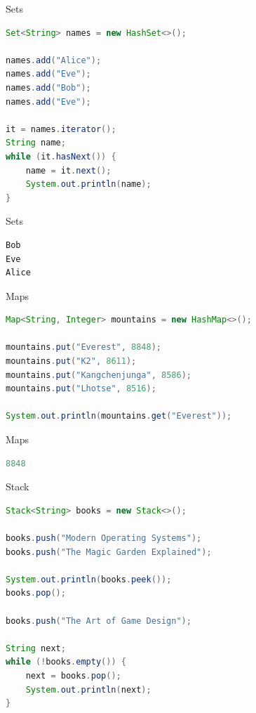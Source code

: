\documentclass[18pt]{beamer}
\begin{document}
\begin{frame}[fragile]{Sets}
    \begin{lstlisting}[language=Java]
Set<String> names = new HashSet<>();

names.add("Alice");
names.add("Eve");
names.add("Bob");
names.add("Eve");

it = names.iterator();
String name;
while (it.hasNext()) {
    name = it.next();
    System.out.println(name);
}
    \end{lstlisting}

\end{frame}

\begin{frame}[fragile]{Sets}
    \begin{exampleblock}{}
        \begin{lstlisting}[language=Java]
Bob
Eve
Alice
        \end{lstlisting}
    \end{exampleblock}

\end{frame}


\begin{frame}[fragile]{Maps}
    \begin{lstlisting}[language=Java]
Map<String, Integer> mountains = new HashMap<>();

mountains.put("Everest", 8848);
mountains.put("K2", 8611);
mountains.put("Kangchenjunga", 8586);
mountains.put("Lhotse", 8516);

System.out.println(mountains.get("Everest"));
    \end{lstlisting}
\end{frame}

\begin{frame}[fragile]{Maps}

    \begin{exampleblock}{}
        \begin{lstlisting}[language=Java]
8848
        \end{lstlisting}

    \end{exampleblock}
\end{frame}


\begin{frame}[fragile]{Stack}
    \begin{lstlisting}[language=Java]
Stack<String> books = new Stack<>();

books.push("Modern Operating Systems");
books.push("The Magic Garden Explained");

System.out.println(books.peek());
books.pop();

books.push("The Art of Game Design");

String next;
while (!books.empty()) {
    next = books.pop();
    System.out.println(next);
}
    \end{lstlisting}

\end{frame}
\end{document}
